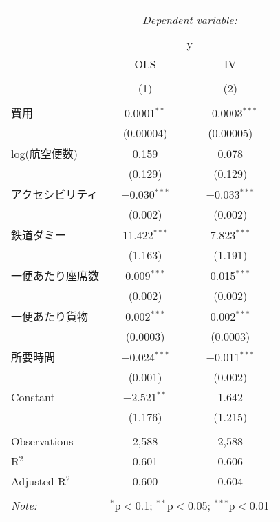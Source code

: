 \documentclass{jsarticle}
\begin{document}
\begin{table}[!htbp] \centering 
  \caption{} 
  \label{} 
\begin{tabular}{@{\extracolsep{5pt}}lcc} 
\\[-1.8ex]\hline 
\hline \\[-1.8ex] 
 & \multicolumn{2}{c}{\textit{Dependent variable:}} \\ 
\cline{2-3} 
\\[-1.8ex] & \multicolumn{2}{c}{y} \\ 
 & OLS & IV \\ 
\\[-1.8ex] & (1) & (2)\\ 
\hline \\[-1.8ex] 
 費用 & 0.0001$^{**}$ & $-$0.0003$^{***}$ \\ 
  & (0.00004) & (0.00005) \\ 
  log(航空便数) & 0.159 & 0.078 \\ 
  & (0.129) & (0.129) \\ 
  アクセシビリティ & $-$0.030$^{***}$ & $-$0.033$^{***}$ \\ 
  & (0.002) & (0.002) \\ 
  鉄道ダミー & 11.422$^{***}$ & 7.823$^{***}$ \\ 
  & (1.163) & (1.191) \\ 
  一便あたり座席数 & 0.009$^{***}$ & 0.015$^{***}$ \\ 
  & (0.002) & (0.002) \\ 
  一便あたり貨物 & 0.002$^{***}$ & 0.002$^{***}$ \\ 
  & (0.0003) & (0.0003) \\ 
  所要時間 & $-$0.024$^{***}$ & $-$0.011$^{***}$ \\ 
  & (0.001) & (0.002) \\ 
  Constant & $-$2.521$^{**}$ & 1.642 \\ 
  & (1.176) & (1.215) \\ 
 \hline \\[-1.8ex] 
Observations & 2,588 & 2,588 \\ 
R$^{2}$ & 0.601 & 0.606 \\ 
Adjusted R$^{2}$ & 0.600 & 0.604 \\ 
\hline 
\hline \\[-1.8ex] 
\textit{Note:}  & \multicolumn{2}{r}{$^{*}$p$<$0.1; $^{**}$p$<$0.05; $^{***}$p$<$0.01} \\ 
\end{tabular} 
\end{table}
\end{document}
